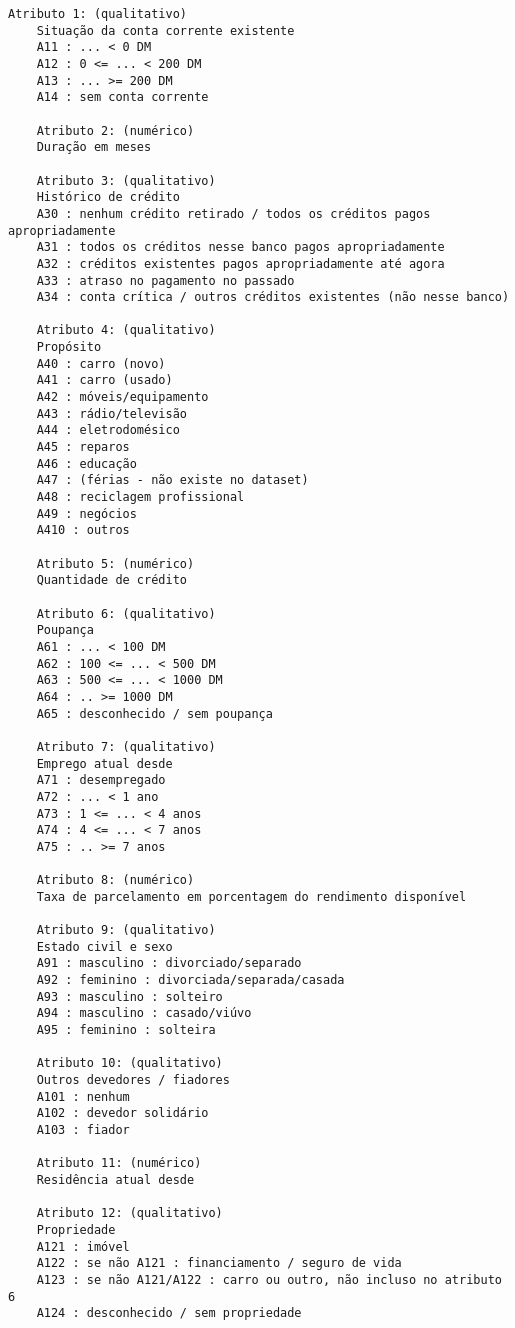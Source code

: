 \begin{lstlisting}[caption=Atributos do primeiro dataset,label=lst:german_dataset]
    Atributo 1: (qualitativo)
    Situação da conta corrente existente
    A11 : ... < 0 DM
    A12 : 0 <= ... < 200 DM
    A13 : ... >= 200 DM
    A14 : sem conta corrente

    Atributo 2: (numérico)
    Duração em meses

    Atributo 3: (qualitativo)
    Histórico de crédito
    A30 : nenhum crédito retirado / todos os créditos pagos apropriadamente
    A31 : todos os créditos nesse banco pagos apropriadamente
    A32 : créditos existentes pagos apropriadamente até agora
    A33 : atraso no pagamento no passado
    A34 : conta crítica / outros créditos existentes (não nesse banco)

    Atributo 4: (qualitativo)
    Propósito
    A40 : carro (novo)
    A41 : carro (usado)
    A42 : móveis/equipamento
    A43 : rádio/televisão
    A44 : eletrodomésico
    A45 : reparos
    A46 : educação
    A47 : (férias - não existe no dataset)
    A48 : reciclagem profissional
    A49 : negócios
    A410 : outros

    Atributo 5: (numérico)
    Quantidade de crédito

    Atributo 6: (qualitativo)
    Poupança
    A61 : ... < 100 DM
    A62 : 100 <= ... < 500 DM
    A63 : 500 <= ... < 1000 DM
    A64 : .. >= 1000 DM
    A65 : desconhecido / sem poupança

    Atributo 7: (qualitativo)
    Emprego atual desde
    A71 : desempregado
    A72 : ... < 1 ano
    A73 : 1 <= ... < 4 anos
    A74 : 4 <= ... < 7 anos
    A75 : .. >= 7 anos

    Atributo 8: (numérico)
    Taxa de parcelamento em porcentagem do rendimento disponível

    Atributo 9: (qualitativo)
    Estado civil e sexo
    A91 : masculino : divorciado/separado
    A92 : feminino : divorciada/separada/casada
    A93 : masculino : solteiro
    A94 : masculino : casado/viúvo
    A95 : feminino : solteira

    Atributo 10: (qualitativo)
    Outros devedores / fiadores
    A101 : nenhum
    A102 : devedor solidário
    A103 : fiador

    Atributo 11: (numérico)
    Residência atual desde

    Atributo 12: (qualitativo)
    Propriedade
    A121 : imóvel
    A122 : se não A121 : financiamento / seguro de vida
    A123 : se não A121/A122 : carro ou outro, não incluso no atributo 6
    A124 : desconhecido / sem propriedade


\end{lstlisting}

